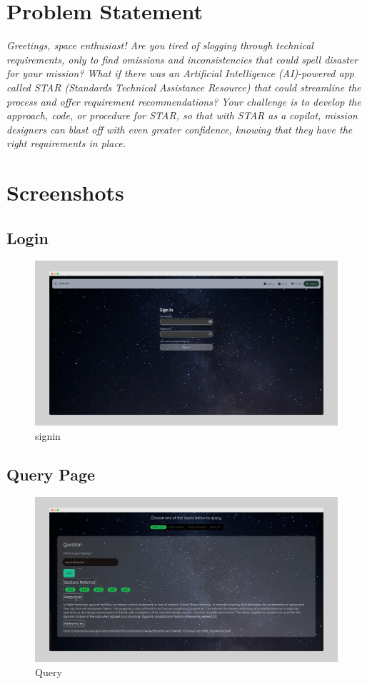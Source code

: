 \documentclass[11pt]{article}
\begin{document}
\tableofcontents
\thispagestyle{empty}
\clearpage

\setcounter{page}{1}

\section{Problem Statement}

\textit{Greetings, space enthusiast! Are you tired of slogging through technical requirements, only to find omissions and inconsistencies that could spell disaster for your mission? What if there was an Artificial Intelligence (AI)-powered app called STAR (Standards Technical Assistance Resource) that could streamline the process and offer requirement recommendations? Your challenge is to develop the approach, code, or procedure for STAR, so that with STAR as a copilot, mission designers can blast off with even greater confidence, knowing that they have the right requirements in place.}

\section{Screenshots}

\subsection{Login}
\begin{figure}[H]
	\centering
	\includegraphics[width=.95\textwidth]{./signin.png}
	\caption{signin}
\end{figure}
\subsection{Query Page}
\begin{figure}[H]
	\centering
	\includegraphics[width=.95\textwidth]{./answer.png}
	\caption{Query}
\end{figure}
\end{document}
